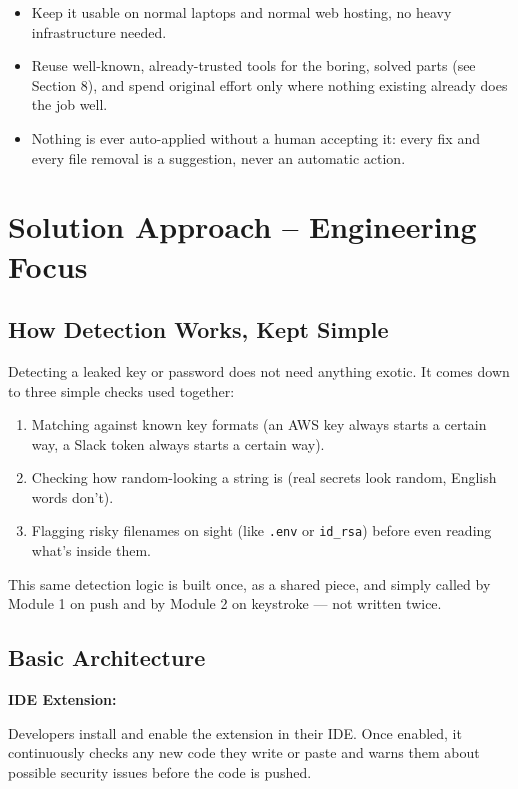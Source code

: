 \documentclass[12pt,a4paper]{article}
\begin{document}
\begin{itemize}
    \item Keep it usable on normal laptops and normal web hosting, no heavy infrastructure needed.

    \item Reuse well-known, already-trusted tools for the boring, solved parts (see Section 8), and spend original effort only where nothing existing already does the job well.

    \item Nothing is ever auto-applied without a human accepting it: every fix and every file removal is a suggestion, never an automatic action.
\end{itemize}

\section{Solution Approach -- Engineering Focus}

\subsection{How Detection Works, Kept Simple}

Detecting a leaked key or password does not need anything exotic. It comes down to three simple checks used together:

\begin{enumerate}
    \item Matching against known key formats (an AWS key always starts a certain way, a Slack token always starts a certain way).
    \item Checking how random-looking a string is (real secrets look random, English words don't).
    \item Flagging risky filenames on sight (like \texttt{.env} or \texttt{id\_rsa}) before even reading what's inside them.
\end{enumerate}

This same detection logic is built once, as a shared piece, and simply called by Module 1 on push and by Module 2 on keystroke --- not written twice.

\subsection{Basic Architecture}

\textbf{IDE Extension:}

Developers install and enable the extension in their IDE. Once enabled, it continuously checks any new code they write or paste and warns them about possible security issues before the code is pushed.
\end{document}
